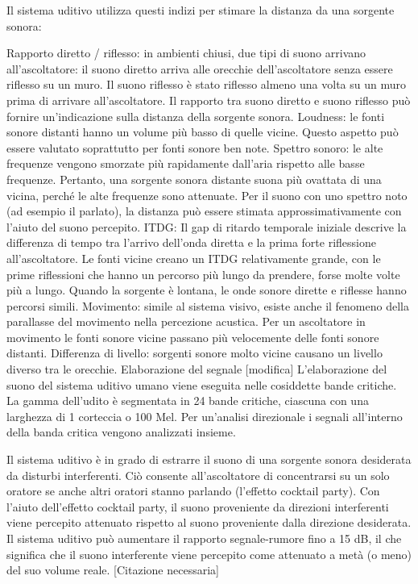 {Il sistema uditivo utilizza questi indizi per stimare la distanza da una sorgente sonora:

Rapporto diretto / riflesso: in ambienti chiusi, due tipi di suono arrivano all'ascoltatore: il suono diretto arriva alle orecchie dell'ascoltatore senza essere riflesso su un muro. Il suono riflesso è stato riflesso almeno una volta su un muro prima di arrivare all'ascoltatore. Il rapporto tra suono diretto e suono riflesso può fornire un'indicazione sulla distanza della sorgente sonora.
Loudness: le fonti sonore distanti hanno un volume più basso di quelle vicine. Questo aspetto può essere valutato soprattutto per fonti sonore ben note.
Spettro sonoro: le alte frequenze vengono smorzate più rapidamente dall'aria rispetto alle basse frequenze. Pertanto, una sorgente sonora distante suona più ovattata di una vicina, perché le alte frequenze sono attenuate. Per il suono con uno spettro noto (ad esempio il parlato), la distanza può essere stimata approssimativamente con l'aiuto del suono percepito.
ITDG: Il gap di ritardo temporale iniziale descrive la differenza di tempo tra l'arrivo dell'onda diretta e la prima forte riflessione all'ascoltatore. Le fonti vicine creano un ITDG relativamente grande, con le prime riflessioni che hanno un percorso più lungo da prendere, forse molte volte più a lungo. Quando la sorgente è lontana, le onde sonore dirette e riflesse hanno percorsi simili.
Movimento: simile al sistema visivo, esiste anche il fenomeno della parallasse del movimento nella percezione acustica. Per un ascoltatore in movimento le fonti sonore vicine passano più velocemente delle fonti sonore distanti.
Differenza di livello: sorgenti sonore molto vicine causano un livello diverso tra le orecchie.
Elaborazione del segnale [modifica]
L'elaborazione del suono del sistema uditivo umano viene eseguita nelle cosiddette bande critiche. La gamma dell'udito è segmentata in 24 bande critiche, ciascuna con una larghezza di 1 corteccia o 100 Mel. Per un'analisi direzionale i segnali all'interno della banda critica vengono analizzati insieme.

Il sistema uditivo è in grado di estrarre il suono di una sorgente sonora desiderata da disturbi interferenti. Ciò consente all'ascoltatore di concentrarsi su un solo oratore se anche altri oratori stanno parlando (l'effetto cocktail party). Con l'aiuto dell'effetto cocktail party, il suono proveniente da direzioni interferenti viene percepito attenuato rispetto al suono proveniente dalla direzione desiderata. Il sistema uditivo può aumentare il rapporto segnale-rumore fino a 15 dB, il che significa che il suono interferente viene percepito come attenuato a metà (o meno) del suo volume reale. [Citazione necessaria]

}
